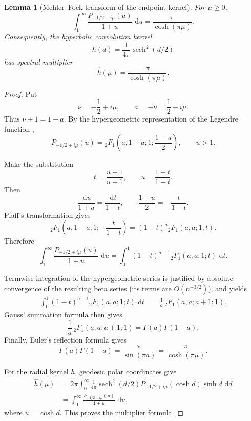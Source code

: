 \IfFileExists{iopjournal.cls}{\documentclass{iopjournal}}{\documentclass{iopjournal-draft}}
\newtheorem{lemma}[theorem]{Lemma}
\theoremstyle{definition}
\theoremstyle{remark}
\newcommand{\dd}{\,\mathrm d}
\newcommand{\sech}{\operatorname{sech}}
\numberwithin{equation}{section}
\begin{document}
\begin{lemma}[Mehler--Fock transform of the endpoint kernel]
    \label{lem:mehler-fock}
	For $\mu\geq0$,
	\begin{equation}
		\int_1^\infty
		\frac{P_{-1/2+i\mu}(u)}{1+u}\,\dd u
		=
		\frac{\pi}{\cosh(\pi\mu)}.
		\label{eq:mehler-fock-integral}
	\end{equation}
	Consequently, the hyperbolic convolution kernel
	\[
	h(d)=\frac1{4\pi}\sech^2(d/2)
	\]
	has spectral multiplier
	\[
	\widehat h(\mu)=\frac{\pi}{\cosh(\pi\mu)}.
	\]
\end{lemma}

\begin{proof}
	Put
	\[
	\nu=-\frac12+i\mu,
	\qquad
	a=-\nu=\frac12-i\mu.
	\]
	Thus $\nu+1=1-a$.  By the hypergeometric representation of
	the Legendre function
	\cite[\href{https://dlmf.nist.gov/14.3.E6}{DLMF 14.3.6}]
	{NIST:DLMF},
	\[
	P_{-1/2+i\mu}(u)
	=
	{}_2F_1\left(
	a,1-a;1;\frac{1-u}{2}
	\right),
	\qquad u>1.
	\]
	
	Make the substitution
	\[
	t=\frac{u-1}{u+1},
	\qquad
	u=\frac{1+t}{1-t}.
	\]
	Then
	\[
	\frac{\dd u}{1+u}=\frac{\dd t}{1-t},
	\qquad
	\frac{1-u}{2}=-\frac{t}{1-t}.
	\]
	Pfaff's transformation
	\cite[\href{https://dlmf.nist.gov/15.8.E1}{DLMF 15.8.1}]
	{NIST:DLMF}
	gives
	\[
	{}_2F_1\left(
	a,1-a;1;-\frac{t}{1-t}
	\right)
	=
	(1-t)^a{}_2F_1(a,a;1;t).
	\]
	Therefore
	\[
	\int_1^\infty
	\frac{P_{-1/2+i\mu}(u)}{1+u}\,\dd u
	=
	\int_0^1
	(1-t)^{a-1}{}_2F_1(a,a;1;t)\,\dd t.
	\]
	
	Termwise integration of the hypergeometric series is justified by absolute convergence of the resulting beta series (its terms are $O(n^{-3/2})$), and yields
	\[
	\begin{aligned}
		\int_0^1
		(1-t)^{a-1}{}_2F_1(a,a;1;t)\,\dd t
		&=
		\frac1a\,{}_2F_1(a,a;a+1;1).
	\end{aligned}
	\]
	Gauss' summation formula
	\cite[NIST:DLMF 15.4.20]{NIST:DLMF}
	then gives
	\[
	\frac1a\,{}_2F_1(a,a;a+1;1)
	=
	\Gamma(a)\Gamma(1-a).
	\]
	Finally, Euler's reflection formula gives
	\[
	\Gamma(a)\Gamma(1-a)
	=
	\frac{\pi}{\sin(\pi a)}
	=
	\frac{\pi}{\cosh(\pi\mu)}.
	\]
	
	For the radial kernel $h$, geodesic polar coordinates give
	\[
	\begin{aligned}
		\widehat h(\mu)
		&=
		2\pi\int_0^\infty
		\frac1{4\pi}\sech^2(d/2)
		P_{-1/2+i\mu}(\cosh d)\sinh d\,\dd d \\
		&=
		\int_1^\infty
		\frac{P_{-1/2+i\mu}(u)}{1+u}\,\dd u,
	\end{aligned}
	\]
	where $u=\cosh d$.  This proves the multiplier formula.
\end{proof}
\end{document}
